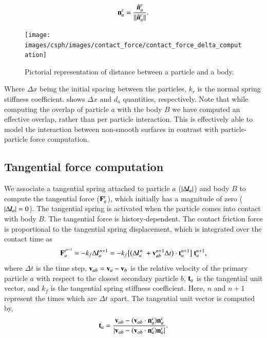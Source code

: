 \begin{equation}
  \label{eq:cf-normal-vector}
  \mathbf{n}_a^{c} = \frac{\boldsymbol{\hat{n}}_a^{c}}{||\boldsymbol{\hat{n}}_a^{c}||}.
\end{equation}
\begin{figure}[!htpb]
  \centering
  \texttt{[image: images/csph/images/contact\_force/contact\_force\_delta\_computation]}
  \caption{Pictorial representation of distance between a particle and a body.}
\label{fig:contact_force_delta_computation}
\end{figure}
Where $\Delta x$ being the initial spacing between the particles, $k_r$ is the
normal spring stiffness coefficient. 
shows $\Delta x$ and $d_a$ quantities, respectively. Note that while computing
the overlap of particle $a$ with the body $B$ we have computed an effective
overlap, rather than per particle interaction. This is effectively able to model
the interaction between non-smooth surfaces in contrast with particle-particle
force computation.

\subsection{Tangential force computation}
\label{sec:tangential-force-computation}
We associate a tangential spring attached to particle $a$
($|\Delta \textit{\textbf{l}}_a|$) and body $B$ to compute the tangential force
($\mathbf{F}_{a}^{t}$), which initially has a magnitude of zero
($|\Delta \textit{\textbf{l}}_a|=0$). The tangential spring is activated when
the particle comes into contact with body $B$. The tangential force is
history-dependent. The contact friction force is proportional to the tangential
spring displacement, which is integrated over the contact time as
\begin{equation}
  \label{eq:tangential-force}
  \mathbf{F}_{a}^{t^{n+1}} =
  -k_f \Delta \textit{\textbf{l}}_a^{\,n + 1} =
  -k_f \big[\big(\Delta {\textit{\textbf{l}}}_a^{\,n} \
  + \mathbf{v}_{ab}^{n + 1} \Delta t\big) \cdot \mathbf{t}_a^{n + 1} \big] \
  \mathbf{t}_a^{n + 1},
\end{equation}
where $\Delta t$ is the time step, $\mathbf{v}_{ab} = \mathbf{v}_{a} - \mathbf{v}_b$ is
the relative velocity of the primary particle $a$ with respect to the closest
secondary particle $b$, $\mathbf{t}_a$ is the tangential unit vector, and $k_f$ is the tangential spring stiffness
coefficient. Here, $n$ and $n+1$ represent the times which are $\Delta t$ apart.
The tangential unit vector is computed by,
\begin{equation}
  \label{eq:tangential-vect}
  \mathbf{t}_a = \frac{\mathbf{v}_{ab} - (\mathbf{v}_{ab} \cdot \mathbf{n}_a^{c}) \mathbf{n}_a^{c}}{|\mathbf{v}_{ab} - (\mathbf{v}_{ab} \cdot \mathbf{n}_a^{c}) \mathbf{n}_a^{c}|}.
\end{equation}

